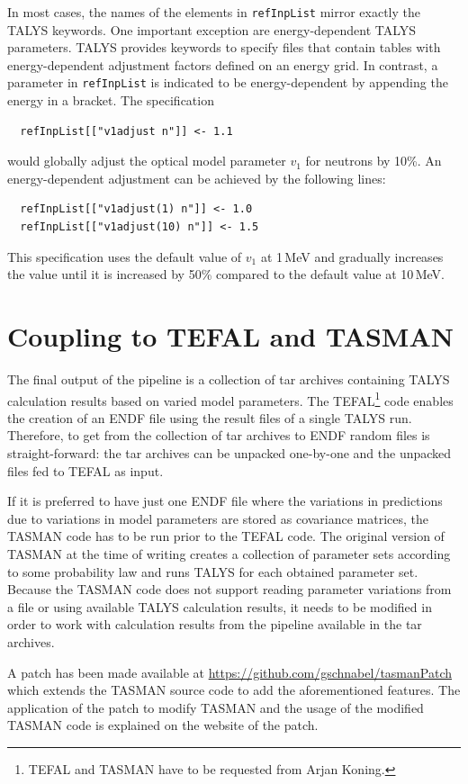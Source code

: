\documentclass[12pt,a4paper]{scrartcl}
\begin{document}
In most cases, the names of the elements in \verb#refInpList# mirror exactly the TALYS keywords.
One important exception are energy-dependent TALYS parameters.
TALYS provides keywords to specify files that contain tables with energy-dependent adjustment factors defined on an energy grid.
In contrast, a parameter in \verb#refInpList# is indicated to be energy-dependent by appending the energy in a bracket.
The specification
\begin{verbatim}
  refInpList[["v1adjust n"]] <- 1.1
\end{verbatim}
would globally adjust the optical model parameter $v_1$ for neutrons by 10\%.
An energy-dependent adjustment can be achieved by the following lines:
\begin{verbatim}
  refInpList[["v1adjust(1) n"]] <- 1.0
  refInpList[["v1adjust(10) n"]] <- 1.5 
\end{verbatim}
This specification uses the default value of $v_1$ at 1\,MeV and gradually increases the value until it is increased by 50\% compared to the default value at 10\,MeV. 

 \section{Coupling to TEFAL and TASMAN}
 \label{sec:coupling_tefal_tasman}
 The final output of the pipeline is a collection of tar archives containing TALYS calculation results based on varied model parameters.
 The TEFAL\footnote{TEFAL and TASMAN have to be requested from Arjan Koning.} code enables the creation of an ENDF file using the result files of a single TALYS run.
 Therefore, to get from the collection of tar archives to ENDF random files is straight-forward: the tar archives can be unpacked one-by-one and the unpacked files fed to TEFAL as input.
 
 If it is preferred to have just one ENDF file where the variations in predictions due to variations in model parameters are stored as covariance matrices, the TASMAN code has to be run prior to the TEFAL code.
 The original version of TASMAN at the time of writing creates a collection of parameter sets according to some probability law and runs TALYS for each obtained parameter set.
 Because the TASMAN code does not support reading parameter variations from a file or using available TALYS calculation results, it needs to be modified in order to work with calculation results from the pipeline available in the tar archives.

A patch has been made available at \url{https://github.com/gschnabel/tasmanPatch} which extends the TASMAN source code to add the aforementioned features.
The application of the patch to modify TASMAN and the usage of the modified TASMAN code is explained on the website of the patch.
\end{document}
